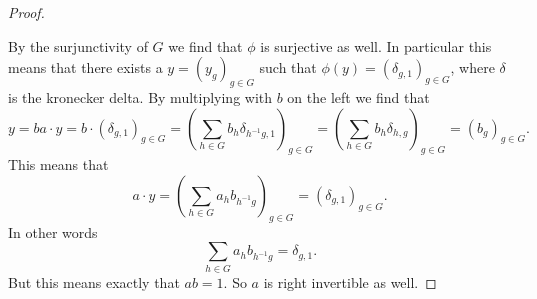 \documentclass[titlepage, a4paper]{article}
\theoremstyle{remark}
\begin{document}
\begin{proof}
\begin{itemize}
				
		\end{itemize}
		By the surjunctivity of $G$ we find that $\phi$ is surjective as well. In particular this means that there exists a $y = (y_g)_{g \in G}$ such that $\phi(y) = (\delta_{g, 1})_{g \in G}$, where $\delta$ is the kronecker delta.
		By multiplying with $b$ on the left we find that \[
			 y = ba\cdot y = b\cdot (\delta_{g, 1})_{g \in G} = \left( \sum_{h \in G} b_{h} \delta_{h^{-1}g, 1} \right)_{g \in G} = \left( \sum_{h \in G} b_{h} \delta_{h, g} \right)_{g \in G}
		 = \left( b_{g} \right) _{g \in G}.\] 
		This means that \[
		a\cdot y = \left( \sum_{h \in G} a_h b_{h^{-1}g} \right)_{g \in G} = \left( \delta_{g, 1} \right) _{g \in G} 
	.\] 
	In other words
	\[
	\sum_{h \in G} a_h b_{h^{-1}g} = \delta_{g, 1}
	.\]
	But this means exactly that $ab = 1$. So  $a$ is right invertible as well. 
	\end{proof}	
	\printbibliography
\end{document}
